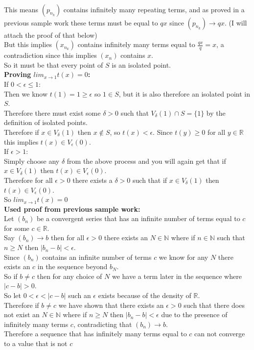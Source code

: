 \documentclass{article}
\begin{document}
\begin{center}
    \\This means $(p_{n_k})$ contains infinitely many repeating terms, and as proved in a previous sample work these terms must be equal to $qx$ since $(p_{n_k})\rightarrow qx$. (I will attach the proof of that below)
    \\But this implies $(x_{n_k})$ contains infinitely many terms equal to $\frac{qx}{q} = x$, a contradiction since this implies $(x_n)$ contains $x$.
    \\So it must be that every point of $S$ is an isolated point.
    \\\textbf{Proving $lim_{x\rightarrow 1} t(x) = 0$:}
    \\If $0 <\epsilon\leq 1$:
    \\Then we know $t(1) = 1\geq\epsilon$ so $1\in S$, but it is also therefore an isolated point in $S$.
    \\Therefore there must exist some $\delta > 0$ such that $V_{\delta} (1)\cap S = \{1\}$ by the definition of isolated points.
    \\Therefore if $x\in V_{\delta} (1)$ then $x\notin S$, so $t(x) <\epsilon$. Since $t(y)\geq 0$ for all $y\in\mathbb{R}$ this implies $t(x)\in V_{\epsilon} (0)$.
    \\If $\epsilon > 1$:
    \\Simply choose any $\delta$ from the above process and you will again get that if $x\in V_{\delta} (1)$ then $t(x)\in V_{\epsilon} (0)$.
    \\Therefore for all $\epsilon > 0$ there exists a $\delta > 0$ such that if $x\in V_{\delta} (1)$ then $t(x)\in V_{\epsilon} (0)$.
    \\So $lim _{x\rightarrow 1} t(x) = 0$ \qedsymbol
    \\\textbf{Used proof from previous sample work:}
    \\Let $(b_n)$ be a convergent series that has an infinite number of terms equal to $c$ for some $c\in\mathbb{R}$.
    \\Say $(b_n)\rightarrow b$ then for all $\epsilon > 0$ there exists an $N\in\mathbb{N}$ where if $n\in\mathbb{N}$ such that $n\geq N$ then $|b_n - b| <\epsilon$.
    \\Since $(b_n)$ contains an infinite number of terms $c$ we know for any $N$ there exists an $c$ in the sequence beyond $b_N$.
    \\So if $b\neq c$ then for any choice of $N$ we have a term later in the sequence where $|c - b| > 0$.
    \\So let $0 <\epsilon < |c - b|$ such an $\epsilon$ exists because of the density of $\mathbb{R}$.
    \\Therefore if $b\neq c$ we have shown that there exists an $\epsilon > 0$ such that there does not exist an $N\in\mathbb{N}$ where if $n\geq N$ then $|b_n - b| <\epsilon$ due to the presence of infinitely many terms $c$, contradicting that $(b_n)\rightarrow b$.
    \\Therefore a sequence that has infinitely many terms equal to $c$ can not converge to a value that is not $c$ \qedsymbol
\end{center}
\end{document}
